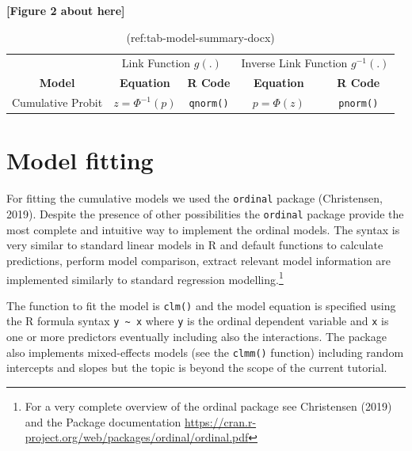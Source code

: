 \documentclass[
  man, mask,floatsintext]{apa6}
\begin{document}
\begin{center}\textbf{[Figure 2 about here]} \end{center}

\normalsize

\scriptsize

\normalsize

\scriptsize

\begin{table}

\caption{\label{tab:tab-model-summary-latex}(ref:tab-model-summary-docx)}
\centering
\begin{tabular}[t]{ccccc}
\toprule
\multicolumn{1}{c}{} & \multicolumn{2}{c}{Link Function $g(.)$} & \multicolumn{2}{c}{Inverse Link Function $g^{-1}(.)$} \\
\cmidrule(l{3pt}r{3pt}){2-3} \cmidrule(l{3pt}r{3pt}){4-5}
\textbf{Model} & \textbf{Equation} & \textbf{R Code} & \textbf{Equation} & \textbf{R Code}\\
\midrule
Cumulative Probit & $z = \Phi^{-1}(p)$ & \texttt{qnorm()} & $p = \Phi(z)$ & \texttt{pnorm()}\\
\bottomrule
\end{tabular}
\end{table}

\normalsize

\scriptsize

\normalsize

\section{Model fitting}\label{model-fitting}

For fitting the cumulative models we used the \texttt{ordinal} package (Christensen, 2019). Despite the presence of other possibilities the \texttt{ordinal} package provide the most complete and intuitive way to implement the ordinal models. The syntax is very similar to standard linear models in R and default functions to calculate predictions, perform model comparison, extract relevant model information are implemented similarly to standard regression modelling.\footnote{For a very complete overview of the ordinal package see Christensen (2019) and the Package documentation \url{https://cran.r-project.org/web/packages/ordinal/ordinal.pdf}}

The function to fit the model is \texttt{clm()} and the model equation is specified using the R formula syntax \texttt{y\ \textasciitilde{}\ x} where \texttt{y} is the ordinal dependent variable and \texttt{x} is one or more predictors eventually including also the interactions. The package also implements mixed-effects models (see the \texttt{clmm()} function) including random intercepts and slopes but the topic is beyond the scope of the current tutorial.
\end{document}
